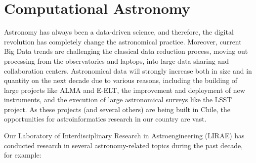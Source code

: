 \section{Computational Astronomy}

Astronomy has always been a data-driven science, and therefore,
the digital revolution has completely change the astronomical practice.
Moreover, current Big Data trends are challenging the classical
data reduction process, moving out processing from the observatories and laptops,
into large data sharing and collaboration centers. Astronomical data will
strongly increase both in size and in quantity on the next decade due to various
reasons, including the building of large projects like ALMA and E-ELT,
the improvement and deployment of new instruments, and the execution of
large astronomical surveys like the LSST project.
As these projects (and several others) are being built in Chile,
the opportunities for astroinformatics research in our country are vast.

Our Laboratory of Interdisciplinary Research in Astroengineering (LIRAE)
has conducted research in several astronomy-related topics during the past
decade, for example:

